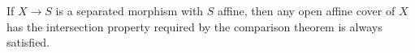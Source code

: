 If $X\to S$ is a separated morphism with $S$ affine, then any open affine
cover of $X$ has the intersection property required by the comparison theorem
is always satisfied.
